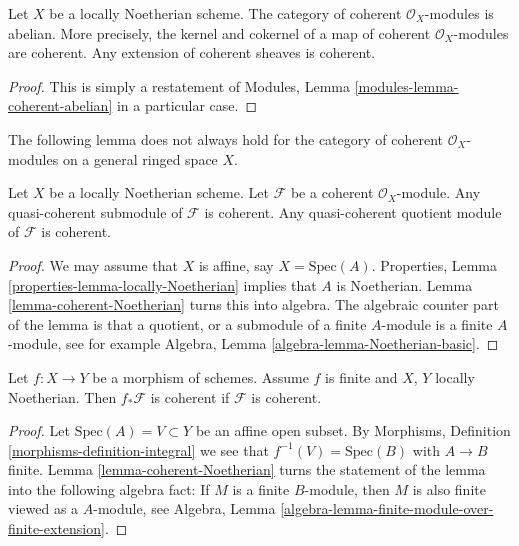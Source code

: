 \begin{lemma}
\label{lemma-coherent-abelian-Noetherian}
Let $X$ be a locally Noetherian scheme.
The category of coherent $\mathcal{O}_X$-modules is abelian.
More precisely, the kernel and cokernel of a map of coherent
$\mathcal{O}_X$-modules are coherent. Any extension
of coherent sheaves is coherent.
\end{lemma}

\begin{proof}
This is simply a restatement of
Modules, Lemma \ref{modules-lemma-coherent-abelian}
in a particular case.
\end{proof}

\noindent
The following lemma does not always hold for the category of coherent
$\mathcal{O}_X$-modules on a general ringed space $X$.

\begin{lemma}
\label{lemma-coherent-Noetherian-quasi-coherent-sub-quotient}
Let $X$ be a locally Noetherian scheme.
Let $\mathcal{F}$ be a coherent $\mathcal{O}_X$-module.
Any quasi-coherent submodule of $\mathcal{F}$ is coherent.
Any quasi-coherent quotient module of $\mathcal{F}$ is coherent.
\end{lemma}

\begin{proof}
We may assume that $X$ is affine, say $X = \text{Spec}(A)$.
Properties, Lemma \ref{properties-lemma-locally-Noetherian}
implies that $A$ is Noetherian. Lemma \ref{lemma-coherent-Noetherian}
turns this into algebra. The algebraic counter part of
the lemma is that a quotient, or a submodule of a finite $A$-module
is a finite $A$-module, see for example
Algebra, Lemma \ref{algebra-lemma-Noetherian-basic}.
\end{proof}

\begin{lemma}
\label{lemma-finite-pushforward-coherent}
Let $f : X \to Y$ be a morphism of schemes.
Assume $f$ is finite and $X$, $Y$ locally Noetherian.
Then $f_*\mathcal{F}$ is coherent if $\mathcal{F}$ is
coherent.
\end{lemma}

\begin{proof}
Let $\text{Spec}(A) = V \subset Y$ be an affine open subset.
By Morphisms, Definition \ref{morphisms-definition-integral}
we see that $f^{-1}(V) = \text{Spec}(B)$ with $A \to B$ finite.
Lemma \ref{lemma-coherent-Noetherian}
turns the statement of the lemma into the following algebra
fact: If $M$ is a finite $B$-module, then $M$ is also finite
viewed as a $A$-module, see
Algebra, Lemma \ref{algebra-lemma-finite-module-over-finite-extension}.
\end{proof}

